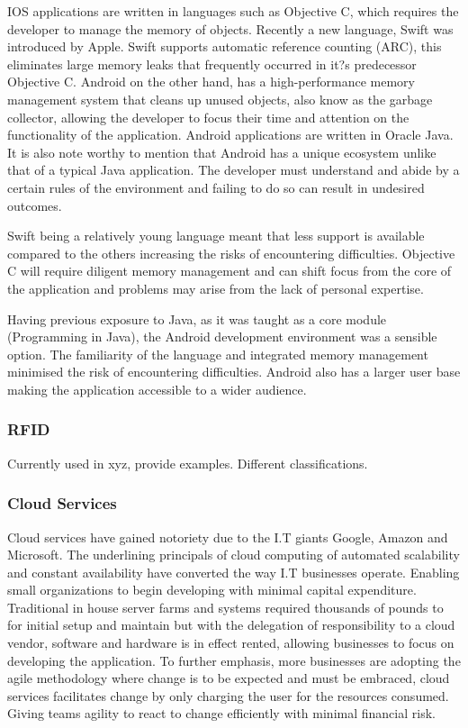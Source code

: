 \documentclass[a4paper, 11pt]{article}
\begin{document}
IOS applications are written in languages such as Objective C, which requires the developer to manage the memory of objects. Recently a new language, Swift was introduced by Apple. Swift supports automatic reference counting (ARC), this eliminates large memory leaks that frequently occurred in it?s predecessor Objective C. Android on the other hand, has a high-performance memory management system that cleans up unused objects, also know as the garbage collector, allowing the developer to focus their time and attention on the functionality of the application. Android applications are written in Oracle Java. It is also note worthy to mention that Android has a unique ecosystem unlike that of a typical Java application. The developer must understand and abide by a certain rules of the environment and failing to do so can result in undesired outcomes. 

Swift being a relatively young language meant that less support is available compared to the others increasing the risks of encountering difficulties. Objective C will require diligent memory management and can shift focus from the core of the application and problems may arise from the lack of personal expertise.

Having previous exposure to Java, as it was taught as a core module (Programming in Java), the Android development environment was a sensible option. The familiarity of the language and integrated memory management minimised the risk of encountering difficulties. Android also has a larger user base making the application accessible to a wider audience.

\subsubsection{RFID}

Currently used in xyz, provide examples. Different classifications. 

\subsubsection{Cloud Services} 
Cloud services have gained notoriety due to the I.T giants Google, Amazon and Microsoft. The underlining principals of cloud computing of automated scalability and constant availability have converted the way I.T businesses operate. Enabling small organizations to begin developing with minimal capital expenditure. Traditional in house server farms and systems required thousands of pounds to for initial setup and maintain but with the delegation of responsibility to a cloud vendor, software and hardware is in effect rented, allowing businesses to focus on developing the application. To further emphasis, more businesses are adopting the agile methodology where change is to be expected and must be embraced, cloud services facilitates change by only charging the user for the resources consumed. Giving teams agility to react to change efficiently with minimal financial risk.
\end{document}
